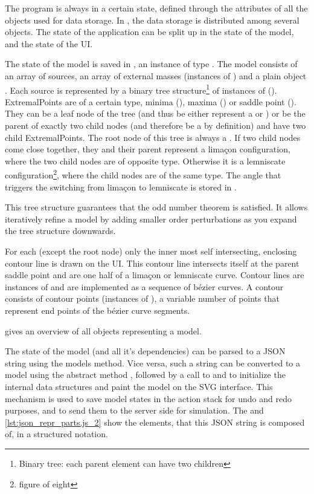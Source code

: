 The program is always in a certain state, defined through the attributes of all the objects used for data storage.
In \spl, the data storage is distributed among several objects.
The state of the application can be split up in the state of the model, and the state of the UI.

The state of the model is saved in , an instance of type .
The model  consists of an array of sources, an array of external masses (instances of ) and a plain object .
Each source is represented by a binary tree structure\footnote{Binary tree: each parent element can have two children} of instances of  ().
ExtremalPoints are of a certain type, minima (), maxima () or saddle point ().
They can be a leaf node of the tree (and thus be either represent a  or ) or be the parent of exactly two child nodes (and therefore be a  by definition) and have two child ExtremalPoints.
The root node of this tree is always a .
If two child nodes come close together, they and their parent represent a limaçon configuration, where the two child nodes are of opposite type.
Otherwise it is a lemniscate configuration\footnote{figure of eight}, where the child nodes are of the same type.
The angle that triggers the switching from limaçon to lemniscate is stored in .

This tree structure guarantees that the odd number theorem is satisfied.
It allows iteratively refine a model by adding smaller order perturbations as you expand the tree structure downwards.


For each  (except the root node) only the inner most self intersecting, enclosing contour line is drawn on the UI.
This contour line intersects itself at the parent saddle point and are one half of a limaçon or lemniscate curve.
Contour lines are instances of  and are implemented as a sequence of bézier curves.
A contour consists of contour points (instances of ), a variable number of points that represent end points of the bézier curve segments.

 gives an overview of all objects representing a model.

The state of the model (and all it's dependencies) can be parsed to a JSON string using the models  method.
Vice versa, such a string can be converted to a model using the abstract method , followed by a call to  and  to initialize the internal data structures and paint the model on the SVG interface.
This mechanism is used to save model states in the action stack for undo and redo purposes, and to send them to the server side for simulation.
The  and \ref{lst:json_repr_parts.js_2} show the elements, that this JSON string is composed of, in a structured notation.

